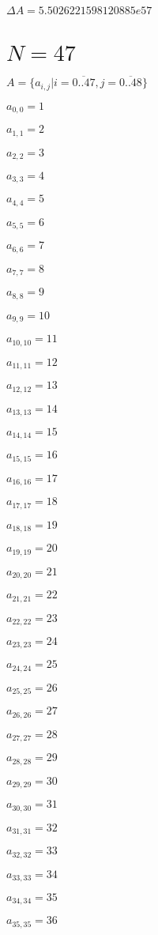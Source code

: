 \documentclass[a4paper,12pt]{article}
\begin{document}
$\Delta A = 5.5026221598120885e57$



\section{ $N = 47$ }
$A = \{ a _{ i, j } | i = \overline { 0..47 }, j = \overline { 0..48 } \}$

$a _{ 0, 0 } = 1$

$a _{ 1, 1 } = 2$

$a _{ 2, 2 } = 3$

$a _{ 3, 3 } = 4$

$a _{ 4, 4 } = 5$

$a _{ 5, 5 } = 6$

$a _{ 6, 6 } = 7$

$a _{ 7, 7 } = 8$

$a _{ 8, 8 } = 9$

$a _{ 9, 9 } = 10$

$a _{ 10, 10 } = 11$

$a _{ 11, 11 } = 12$

$a _{ 12, 12 } = 13$

$a _{ 13, 13 } = 14$

$a _{ 14, 14 } = 15$

$a _{ 15, 15 } = 16$

$a _{ 16, 16 } = 17$

$a _{ 17, 17 } = 18$

$a _{ 18, 18 } = 19$

$a _{ 19, 19 } = 20$

$a _{ 20, 20 } = 21$

$a _{ 21, 21 } = 22$

$a _{ 22, 22 } = 23$

$a _{ 23, 23 } = 24$

$a _{ 24, 24 } = 25$

$a _{ 25, 25 } = 26$

$a _{ 26, 26 } = 27$

$a _{ 27, 27 } = 28$

$a _{ 28, 28 } = 29$

$a _{ 29, 29 } = 30$

$a _{ 30, 30 } = 31$

$a _{ 31, 31 } = 32$

$a _{ 32, 32 } = 33$

$a _{ 33, 33 } = 34$

$a _{ 34, 34 } = 35$

$a _{ 35, 35 } = 36$
\end{document}
